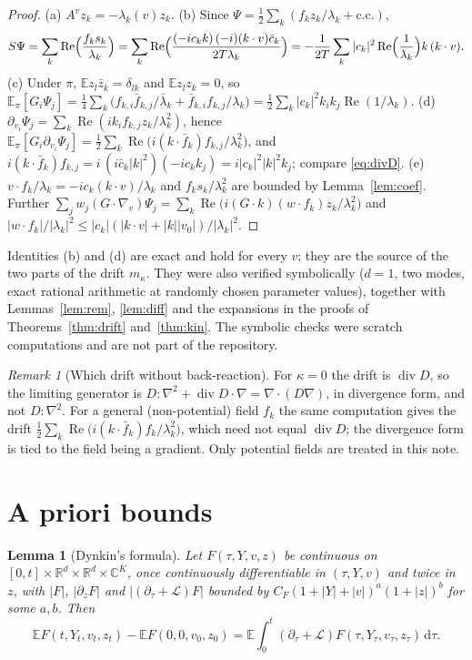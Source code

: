 \documentclass[11pt]{article}
\newcommand{\dd}{\mathrm{d}}
\newcommand{\E}{\mathbb{E}}
\newcommand{\cL}{\mathcal{L}}
\renewcommand{\Re}{\operatorname{Re}}
\newcommand{\Div}{\operatorname{div}}
\newtheorem{lemma}[theorem]{Lemma}
\theoremstyle{remark}
\newtheorem{remark}[theorem]{Remark}
\begin{document}
\begin{proof}
(a) $A^vz_k=-\lambda_k(v)z_k$. (b) Since
$\Psi=\frac12\sum_k(f_kz_k/\lambda_k+\text{c.c.})$,
\[
  S\Psi=\sum_k\Re\Bigl(\frac{f_ks_k}{\lambda_k}\Bigr)
  =\sum_k\Re\Bigl(\frac{(-ic_kk)\,(-i)(k\cdot v)\bar c_k}{2T\lambda_k}\Bigr)
  =-\frac1{2T}\sum_k|c_k|^2\Re\Bigl(\frac1{\lambda_k}\Bigr)k\,(k\cdot v).
\]
(c) Under $\pi$, $\E z_l\bar z_k=\delta_{lk}$ and $\E z_lz_k=0$, so
$\E_\pi[G_i\Psi_j]=\frac14\sum_k\bigl(f_{k,i}\bar f_{k,j}/\bar\lambda_k
+\bar f_{k,i}f_{k,j}/\lambda_k\bigr)
=\frac12\sum_k|c_k|^2k_ik_j\Re(1/\lambda_k)$.
(d) $\partial_{v_i}\Psi_j=\sum_k\Re(ik_if_{k,j}z_k/\lambda_k^2)$, hence
$\E_\pi[G_i\partial_{v_i}\Psi_j]
=\frac12\sum_k\Re\bigl(i(k\cdot\bar f_k)f_{k,j}/\lambda_k^2\bigr)$, and
$i(k\cdot\bar f_k)f_{k,j}=i\,(i\bar c_k|k|^2)(-ic_kk_j)=i|c_k|^2|k|^2k_j$;
compare \eqref{eq:divD}.
(e) $v\cdot f_k/\lambda_k=-ic_k(k\cdot v)/\lambda_k$ and
$f_ks_k/\lambda_k^2$ are bounded by Lemma~\ref{lem:coef}. Further
$\sum_jw_j(G\cdot\nabla_v)\Psi_j
=\sum_k\Re\bigl(i(G\cdot k)(w\cdot f_k)z_k/\lambda_k^2\bigr)$ and
$|w\cdot f_k|/|\lambda_k|^2\le|c_k|(|k\cdot v|+|k||v_0|)/|\lambda_k|^2$.
\end{proof}

Identities (b) and (d) are exact and hold for every $v$; they are the
source of the two parts of the drift $m_\kappa$. They were also verified
symbolically ($d=1$, two modes, exact rational arithmetic at randomly
chosen parameter values), together with Lemmas~\ref{lem:rem},
\ref{lem:diff} and the expansions in the proofs of
Theorems~\ref{thm:drift} and~\ref{thm:kin}. The symbolic checks were
scratch computations and are not part of the repository.

\begin{remark}[Which drift without back-reaction]
For $\kappa=0$ the drift is $\Div D$, so the limiting generator is
$D:\nabla^2+\Div D\cdot\nabla=\nabla\cdot(D\nabla)$, in divergence form, and
not $D:\nabla^2$. For a general (non-potential) field $f_k$ the same
computation gives the drift
$\frac12\sum_k\Re\bigl(i(k\cdot\bar f_k)f_k/\lambda_k^2\bigr)$, which need
not equal $\Div D$; the divergence form is tied to the field being a
gradient. Only potential fields are treated in this note.
\end{remark}

\section{A priori bounds}

\begin{lemma}[Dynkin's formula]\label{lem:dynkin}
Let $F(\tau,Y,v,z)$ be continuous on $[0,t]\times\mathbb{R}^d\times
\mathbb{R}^d\times\mathbb{C}^K$, once continuously differentiable in
$(\tau,Y,v)$ and twice in $z$, with $|F|$, $|\partial_zF|$ and
$|(\partial_\tau+\cL)F|$ bounded by $C_F(1+|Y|+|v|)^a(1+|z|)^b$ for some
$a,b$. Then
\[
  \E F(t,Y_t,v_t,z_t)-\E F(0,0,v_0,z_0)
  =\E\int_0^t(\partial_\tau+\cL)F(\tau,Y_\tau,v_\tau,z_\tau)\,\dd\tau .
\]
\end{lemma}
\end{document}
